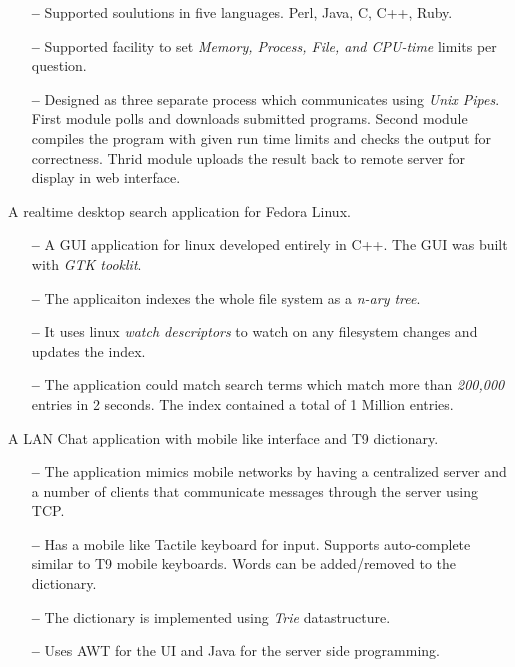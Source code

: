 \documentclass{cv}
\begin{document}
\begin{description}[leftmargin=50pt,labelwidth=50pt]
\begin{itemize}[label={},leftmargin=10pt,topsep=0pt]
      \item[\textbf{--}] Supported soulutions in five languages. Perl, Java, C, C++, Ruby.
      \item[\textbf{--}] Supported facility to set \textit{Memory, Process, File, and CPU-time} limits per question.
      \item[\textbf{--}] Designed as three separate process which communicates using \textit{Unix Pipes}.  First module polls and downloads submitted programs.  Second module compiles the program with given run time limits and checks the output for correctness.  Thrid module uploads the result back to remote server for display in web interface.
    \end{itemize}
  \item[Desktop Search] A realtime desktop search application for Fedora Linux.
    \begin{itemize}[label={},leftmargin=10pt,topsep=0pt]
      \item[\textbf{--}] A GUI application for linux developed entirely in C++.  The GUI was built with \textit{GTK tooklit}.
      \item[\textbf{--}] The applicaiton indexes the whole file system as a \textit{n-ary tree}.
      \item[\textbf{--}] It uses linux \textit{watch descriptors} to watch on any filesystem changes and updates the index.
      \item[\textbf{--}] The application could match search terms which match more than \textit{200,000} entries in 2 seconds.  The index contained a total of 1 Million entries.
    \end{itemize}
  \item[SMS Simulator] A LAN Chat application with mobile like interface and T9 dictionary.
    \begin{itemize}[label={},leftmargin=10pt,topsep=0pt]
      \item[\textbf{--}] The application mimics mobile networks by having a centralized server and a number of clients that communicate messages through the server using TCP\@.
      \item[\textbf{--}] Has a mobile like Tactile keyboard for input.  Supports auto-complete similar to T9 mobile keyboards.  Words can be added/removed to the dictionary.
      \item[\textbf{--}] The dictionary is implemented using \textit{Trie} datastructure.
      \item[\textbf{--}] Uses AWT for the UI and Java for the server side programming.
    \end{itemize}
\end{description}
\end{document}
